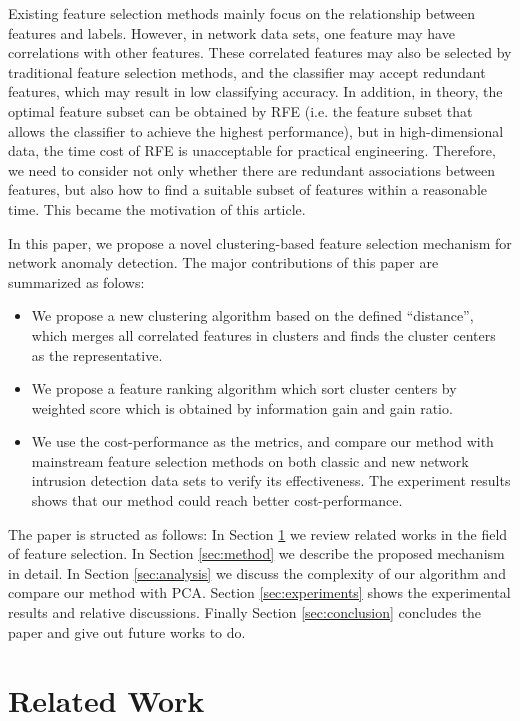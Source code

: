 \documentclass{ieeeaccess}
\theoremstyle{definition}
\begin{document}
Existing feature selection methods mainly focus on the relationship between features and labels. However, in network data sets, one feature may have correlations with other features. These correlated features may also be selected by traditional feature selection methods, and the classifier may accept redundant features, which may result in low classifying accuracy. In addition, in theory, the optimal feature subset can be obtained by RFE (i.e. the feature subset that allows the classifier to achieve the highest performance), but in high-dimensional data, the time cost of RFE is unacceptable for practical engineering. Therefore, we need to consider not only whether there are redundant associations between features, but also how to find a suitable subset of features within a reasonable time. This became the motivation of this article.

In this paper, we propose a novel clustering-based feature selection mechanism for network anomaly detection.
The major contributions of this paper are summarized as folows:

\begin{itemize}
    \item We propose a new clustering algorithm based on the defined ``distance'', which merges all correlated features in clusters and finds the cluster centers as the representative.
    \item We propose a feature ranking algorithm which sort cluster centers by weighted score which is obtained by information gain and gain ratio. 
    \item We use the cost-performance as the metrics, and compare our method with mainstream feature selection methods on both classic and new network intrusion detection data sets to verify its effectiveness. The experiment results shows that our method could reach better cost-performance.
\end{itemize}

The paper is structed as follows: In Section \ref{sec:related-work} we review related works in the field of feature selection. In Section \ref{sec:method} we describe the proposed mechanism in detail. In Section \ref{sec:analysis} we discuss the complexity of our algorithm and compare our method with PCA. Section \ref{sec:experiments} shows the experimental results and relative discussions. Finally Section \ref{sec:conclusion} concludes the paper and give out future works to do.

\section{Related Work}
\label{sec:related-work}
\end{document}
